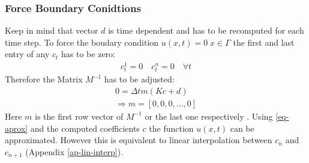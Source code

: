 \subsubsection{Force Boundary Conidtions}
Keep in mind that vector \(d\) is time dependent and has to be recomputed for each time step.
To force the boudary condition \(u(x, t) = 0 \; x \in \Gamma\) the first and last entry of any \(c_{t}\) has to be zero:
\begin{gather}
c_{t}^{1} = 0 \quad c_{t}^{n} = 0 \quad \forall t
\end{gather}
Therefore the Matrix \(M^{-1}\) has to be adjusted:
\begin{gather}
0 = \Delta t m (Kc + d) \\
\Rightarrow m = [0, 0, 0, \dots , 0] \label{force-bound}
\end{gather}
Here \(m\) is the first row vector of \(M^{-1}\) or the last one respectively \cite{Gustafsson2011b}.
Using \ref{eq-aprox} and the computed coefficients \(c\) the function \(u(x,t)\) can be approximated.
However this is equivalent to linear interpolation between \(c_{n}\) and \(c_{n+1}\) (Appendix \ref{ap-lin-interp}).